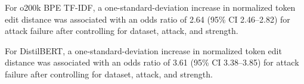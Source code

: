 For o200k BPE TF-IDF, a one-standard-deviation increase in normalized token edit distance was associated with an odds ratio of 2.64 (95\% CI 2.46--2.82) for attack failure after controlling for dataset, attack, and strength.

For DistilBERT, a one-standard-deviation increase in normalized token edit distance was associated with an odds ratio of 3.61 (95\% CI 3.38--3.85) for attack failure after controlling for dataset, attack, and strength.
